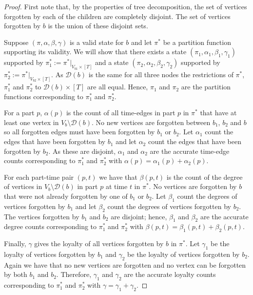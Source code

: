 \documentclass[runningheads]{llncs}
\begin{document}
\begin{proof}
First note that, by the properties of tree decomposition, the set of vertices forgotten by each of the children are completely disjoint. The set of vertices forgotten by $b$ is the union of these disjoint sets.
    
Suppose $(\pi,\alpha,\beta,\gamma)$ is a valid state for $b$ and let $\pi^*$ be a partition function supporting its validity. 
We will show that there exists a state $(\pi_1,\alpha_1,\beta_1,\gamma_1)$ supported by $\pi^*_1:=\pi^*|_{V_{b1} \times [T]}$ and a state $(\pi_2,\alpha_2,\beta_2,\gamma_2)$ supported by $\pi^*_2:=\pi^*|_{V_{b2} \times [T]}$. 
    As $\mathcal{D}(b)$ is the same for all three nodes the restrictions of $\pi^*$, $\pi^*_1$ and $\pi^*_2$ to $\mathcal{D}(b) \times [T]$ are all equal. Hence, $\pi_1$ and $\pi_2$ are the partition functions corresponding to $\pi^*_1$ and $\pi^*_2$.
    
    For a part $p$, $\alpha(p)$ is the count of all time-edges in part $p$ in $\pi^*$ that have at least one vertex in $V_b\setminus \mathcal{D}(b)$. 
    No new vertices are forgotten between $b_1$, $b_2$ and $b$ so all forgotten edges must have been forgotten by $b_1$ or $b_2$. Let $\alpha_1$ count the edges that have been forgotten by $b_1$ and let $\alpha_2$ count the edges that have been forgotten by $b_2$.
    As these are disjoint, $\alpha_1$ and $\alpha_2$ are the accurate time-edge counts corresponding to $\pi^*_1$ and $\pi^*_2$ with $\alpha(p)=\alpha_{1}(p)+\alpha_2(p)$.
    
    For each part-time pair $(p,t)$ we have that $\beta(p,t)$ is the count of the degree of vertices in $V_b\setminus \mathcal{D}(b)$ in part $p$ at time $t$ in $\pi^*$.
    No vertices are forgotten by $b$ that were not already forgotten by one of $b_1$ or $b_2$. Let $\beta_1$ count the degrees of vertices forgotten by $b_1$ and let $\beta_2$ count the degrees of vertices forgotten by $b_2$.
    The vertices forgotten by $b_1$ and $b_2$ are disjoint; hence, $\beta_1$ and $\beta_2$ are the accurate degree counts corresponding to $\pi^*_1$ and $\pi^*_2$ with $\beta(p,t)=\beta_1(p,t)+\beta_2(p,t)$.
    
    Finally, $\gamma$ gives the loyalty of all vertices forgotten by $b$ in $\pi^*$. Let $\gamma_1$ be the loyalty of vertices forgotten by $b_1$ and $\gamma_2$ be the loyalty of vertices forgotten by $b_2$. Again we have that no new vertices are forgotten and no vertex can be forgotten by both $b_1$ and $b_2$.
    Therefore, $\gamma_1$ and $\gamma_2$ are the accurate loyalty counts corresponding to $\pi^*_1$ and $\pi^*_2$ with $\gamma=\gamma_1+\gamma_2$.


\end{proof}
\end{document}
